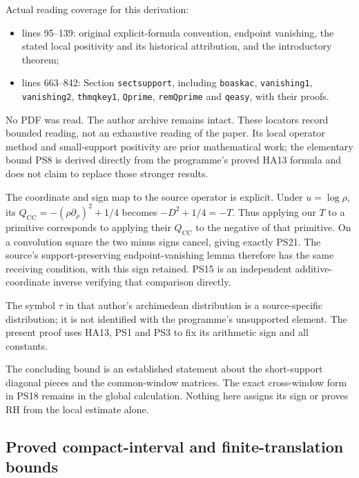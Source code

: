 \documentclass[
  10pt,
  a4paper,
]{article}
\providecommand{\tightlist}{%
  \setlength{\itemsep}{0pt}\setlength{\parskip}{0pt}}
\begin{document}
Actual reading coverage for this derivation:

\begin{itemize}
\tightlist
\item
  lines 95--139: original explicit-formula convention, endpoint
  vanishing, the stated local positivity and its historical attribution,
  and the introductory theorem;
\item
  lines 663--842: Section \texttt{sectsupport}, including
  \texttt{boaskac}, \texttt{vanishing1}, \texttt{vanishing2},
  \texttt{thmqkey1}, \texttt{Qprime}, \texttt{remQprime} and
  \texttt{qeasy}, with their proofs.
\end{itemize}

No PDF was read. The author archive remains intact. These locators
record bounded reading, not an exhaustive reading of the paper. Its
local operator method and small-support positivity are prior
mathematical work; the elementary bound PS8 is derived directly from the
programme's proved HA13 formula and does not claim to replace those
stronger results.

The coordinate and sign map to the source operator is explicit. Under
\(u=\log\rho\), its \(Q_{\mathrm{CC}}=-(\rho\partial_\rho)^2+1/4\)
becomes \(-D^2+1/4=-T\). Thus applying our \(T\) to a primitive
corresponds to applying their \(Q_{\mathrm{CC}}\) to the negative of
that primitive. On a convolution square the two minus signs cancel,
giving exactly PS21. The source's support-preserving endpoint-vanishing
lemma therefore has the same receiving condition, with this sign
retained. PS15 is an independent additive-coordinate inverse verifying
that comparison directly.

The symbol \(\tau\) in that author's archimedean distribution is a
source-specific distribution; it is not identified with the programme's
unsupported element. The present proof uses HA13, PS1 and PS3 to fix its
arithmetic sign and all constants.

The concluding bound is an established statement about the short-support
diagonal pieces and the common-window matrices. The exact cross-window
form in PS18 remains in the global calculation. Nothing here assigns its
sign or proves RH from the local estimate alone.

\subsection{Proved compact-interval and finite-translation
bounds}\label{proved-compact-interval-and-finite-translation-bounds}
\end{document}
